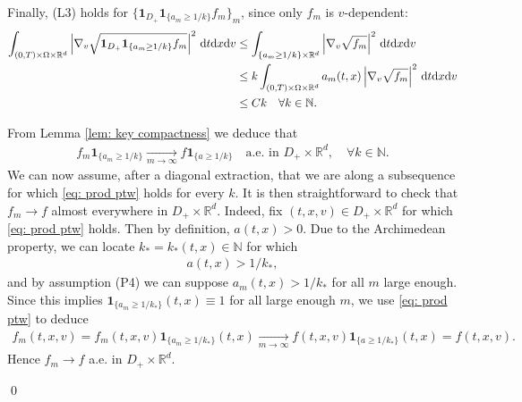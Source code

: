 \documentclass[10pt, reqno]{amsart}
\theoremstyle{plain}
\theoremstyle{definition}
\theoremstyle{remark}
\renewenvironment{proof}[1][\proofname]{\noindent{\scshape #1.\quad}}{\qed}
\numberwithin{equation}{section}
\newcommand{\bbN}{\mathbb N}
\newcommand{\R}{\mathbb{R}}
\newcommand{\dx}{\textnormal{d}x}
\newcommand{\dv}{\textnormal{d}v}
\newcommand{\dt}{\textnormal{d}t}
\begin{document}
\begin{proof}[Proof of Proposition \ref{prop: weighted fisher}]
    Finally, (L3) holds for $\{\mathbf{1}_{D_+}\mathbf{1}_{\{a_m\ge 1/k\}} f_m\}_m$, since only $f_m$ is $v$-dependent:
    \begin{align*}
        \int_{(0,T)\times\Omega\times\R^d} \left|\nabla_v \sqrt{\mathbf{1}_{D_+} \mathbf{1}_{\{a_m\ge 1/k\}} f_m}\right|^2 \,\dt\dx\dv &\le \int_{\{a_m \ge 1/k\}\times\R^d} \left|\nabla_v \sqrt{f_m}\right|^2 \,\dt\dx\dv \\
        &\le k \int_{(0,T)\times\Omega\times\R^d} a_m(t,x) \left|\nabla_v \sqrt{f_m}\right|^2 \,\dt\dx\dv \\
        &\le Ck \quad \forall k\in \bbN.
    \end{align*}

    
    From Lemma \ref{lem: key compactness} we deduce that
    \begin{align} \label{eq: prod ptw}
        f_m \mathbf{1}_{\{a_m\ge 1/k\}}  \xrightarrow[m\to\infty]{}  f \mathbf{1}_{\{a\ge 1/k\}} \quad \text{a.e. in }D_+\times\R^d, \quad \forall k\in \bbN.
    \end{align}
    We can now assume, after a diagonal extraction, that we are along a subsequence for which \eqref{eq: prod ptw} holds for every $k$. It is then straightforward to check that $f_m \to f$ almost everywhere in $D_+\times\R^d$. Indeed, fix $(t,x,v) \in D_+\times \R^d$ for which \eqref{eq: prod ptw} holds. Then by definition, $a(t,x)>0$. Due to the Archimedean property, we can locate $k_* = k_*(t,x)\in \bbN$ for which
    \begin{align*}
        a(t,x) > 1/k_*,
    \end{align*}
    and by assumption (P4) we can suppose $a_m(t,x) > 1/k_*$ for all $m$ large enough. Since this implies $\mathbf{1}_{\{a_m \ge 1/k_*\}}(t,x) \equiv 1$ for all large enough $m$, we use \eqref{eq: prod ptw} to deduce
    \begin{align*}
        f_m(t,x,v) = f_m(t,x,v) \mathbf{1}_{\{a_m\ge 1/k_*\}}(t,x) \xrightarrow[m\to\infty]{} f(t,x,v) \mathbf{1}_{\{a\ge 1/k_*\}}(t,x) = f(t,x,v).
    \end{align*}
    Hence $f_m\to f$ a.e. in $D_+\times \R^d$.
    


\end{proof}
\end{document}
